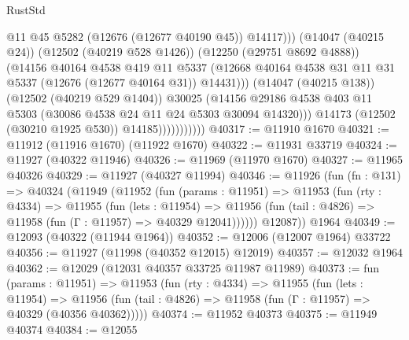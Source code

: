 \begin{lexlean}{RustStd}
\begin{coremodule}
                                    @11
                                    @45
                                    @5282
                                    (@12676 (@12677 @40190 @45))
                                    @14117)))
                              (@14047 (@40215 @24))
                              (@12502 (@40219 @528 @1426))
                              (@12250 (@29751 @8692 @4888))
                              (@14156
                                @40164
                                @4538
                                @419
                                @11
                                @5337
                                (@12668
                                  @40164
                                  @4538
                                  @31
                                  @11
                                  @31
                                  @5337
                                  (@12676 (@12677 @40164 @31))
                                  @14431)))
                            (@14047 (@40215 @138))
                            (@12502 (@40219 @529 @1404))
                            @30025
                            (@14156
                              @29186
                              @4538
                              @403
                              @11
                              @5303
                              (@30086 @4538 @24 @11 @24 @5303 @30094 @14320)))
                          @14173
                          (@12502 (@30210 @1925 @530))
                          @14185)))))))))))
@40317 := @11910 @1670
@40321 := @11912 (@11916 @1670) (@11922 @1670)
@40322 := @11931 @33719
@40324 := @11927 (@40322 @11946)
@40326 := @11969 (@11970 @1670)
@40327 := @11965 @40326
@40329 := @11927 (@40327 @11994)
@40346 := @11926
    (fun (fn : @131) =>
    @40324
      (@11949
        (@11952
          (fun (params : @11951) =>
          @11953
            (fun (rty : @4334) =>
            @11955
              (fun (lets : @11954) =>
              @11956 (fun (tail : @4826) => @11958 (fun (Γ : @11957) => @40329 @12041))))))
        @12087))
    @1964
@40349 := @12093 (@40322 (@11944 @1964))
@40352 := @12006 (@12007 @1964) @33722
@40356 := @11927 (@11998 (@40352 @12015) @12019)
@40357 := @12032 @1964
@40362 := @12029 (@12031 @40357 @33725 @11987 @11989)
@40373 := fun (params : @11951) =>
  @11953
    (fun (rty : @4334) =>
    @11955
      (fun (lets : @11954) =>
      @11956 (fun (tail : @4826) => @11958 (fun (Γ : @11957) => @40329 (@40356 @40362)))))
@40374 := @11952 @40373
@40375 := @11949 @40374
@40384 := @12055

\end{coremodule}
\end{lexlean}
